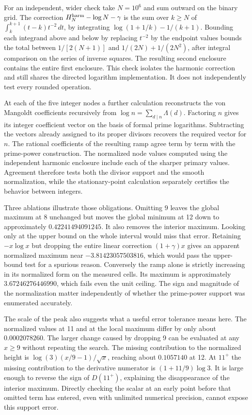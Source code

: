 \documentclass[12pt,letterpaper]{article}
\begin{document}
For an independent, wider check take \(N=10^6\) and sum outward on the binary grid. The correction \(H_N^{\rm harm}-\log N-\gamma\) is the sum over \(k\ge N\) of
\(\int_k^{k+1}(t-k)t^{-2}\,dt\), by integrating \(\log(1+1/k)-1/(k+1)\). Bounding each integrand above and below by replacing \(t^{-2}\) by the endpoint values bounds the total between \(1/[2(N+1)]\) and \(1/(2N)+1/(2N^2)\), after integral comparison on the series of inverse squares. The resulting second enclosure contains the entire first enclosure. This check isolates the harmonic correction and still shares the directed logarithm implementation. It does not independently test every rounded operation.

At each of the five integer nodes a further calculation reconstructs the von Mangoldt coefficients recursively from \(\log n=\sum_{d\mid n}\Lambda(d)\). Factoring \(n\) gives its integer coefficient vector on the basis of formal prime logarithms. Subtracting the vectors already assigned to its proper divisors recovers the required vector for \(n\). The rational coefficients of the resulting ramp agree term by term with the prime-power construction. The normalized node values computed using the independent harmonic enclosure include each of the sharper primary values. Agreement therefore tests both the divisor support and the smooth normalization, while the stationary-point calculation separately certifies the behavior between integers.

Three ablations illustrate those obligations. Omitting \(9\) leaves the global maximum at 8 unchanged but moves the global minimum at 12 down to approximately \(0.42241494091245\). It also removes the interior maximum. Looking only at the upper bound on the whole interval would miss that error. Retaining \(-x\log x\) but dropping the entire linear correction \((1+\gamma)x\) gives an apparent normalized maximum near \(-3.81423057503816\), which would pass the upper-bound test for a spurious reason. Conversely the ramp alone is strictly increasing in its normalized form on the measured cells. Its maximum is approximately \(3.67246276446990\), which fails even the unit ceiling. The sign and magnitude of the normalization matter independently of whether the prime-power support was enumerated accurately.


The scale of the peak also suggests what a useful error tolerance means here. The normalized values at 11 and at the local maximum differ by only about \(0.0002078260\). The larger change caused by dropping 9 can be evaluated at any \(x\ge9\) without repeating the search. The missing contribution to the normalized height is \(\log(3)(x/9-1)/\sqrt{x}\), reaching about \(0.1057140\) at 12. At \(11^+\) the missing contribution to the derivative numerator is \((1+11/9)\log3\). It is large enough to reverse the sign of \(D(11^+)\), explaining the disappearance of the interior maximum. Directly checking the scalar at an early point before that omitted term has entered, even with unlimited numerical precision, cannot expose this support error.
\end{document}

